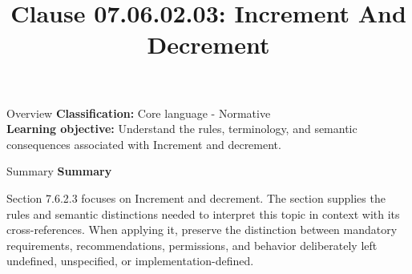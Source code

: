 \documentclass[10pt,letterpaper]{article}
\title{Clause 07.06.02.03: Increment And Decrement}
\author{}
\date{}
\begin{document}
\maketitle
\begin{CornellOverviewBox}{Overview}
\textbf{Classification:} Core language - Normative\\[2pt]
\textbf{Learning objective:} Understand the rules, terminology, and semantic consequences associated with Increment and decrement.
\end{CornellOverviewBox}\begin{CornellSummaryBox}{Summary}
{\sffamily\bfseries\color{Accent} Summary}\par\vspace{3pt}Section 7.6.2.3 focuses on Increment and decrement. The section supplies the rules and semantic distinctions needed to interpret this topic in context with its cross-references. When applying it, preserve the distinction between mandatory requirements, recommendations, permissions, and behavior deliberately left undefined, unspecified, or implementation-defined.
\end{CornellSummaryBox}
\end{document}
